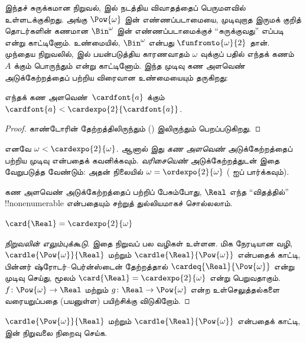 \documentclass[../../../include/open-logic-section]{subfiles}
\begin{document}
இந்தச் சுருக்கமான நிறுவல்,  இல்
நடத்திய விவாதத்தைப் பெருமளவில் உள்ளடக்குகிறது. அங்கு
$\Pow{\omega}$ இன் எண்ணப்படாமையை, முடிவுறாத இருமக் குறித்
தொடர்களின் கணமான $\Bin^\omega$ இன் எண்ணப்படாமைக்குச்
``சுருக்குவது'' எப்படி என்று காட்டினோம். உண்மையில்,
$\Bin^{\omega}$ என்பது $\funfromto{\omega}{2}$ தான்.
முந்தைய நிறுவலில்,  இல்
பயன்படுத்திய காரணவாதம் $\omega$ வுக்குப் பதில் எந்தக் கணம்~$A$
க்கும் பொருந்தும் என்று காட்டினோம். இந்த முடிவு கண அளவெண்
அடுக்கேற்றத்தைப் பற்றிய விரைவான உண்மையையும் தருகிறது:

\begin{cor}
எந்தக் கண அளவெண்~$\cardfont{a}$ க்கும்
$\cardfont{a} < \cardexpo{2}{\cardfont{a}}$.
\end{cor}

\begin{proof}
காண்டோரின் தேற்றத்திலிருந்தும்
()
 இலிருந்தும் பெறப்படுகிறது.
\end{proof}
\noindent
எனவே $\omega < \cardexpo{2}{\omega}$. ஆனால் இது
\emph{கண அளவெண்} அடுக்கேற்றத்தைப் பற்றிய முடிவு என்பதைக்
கவனிக்கவும். \emph{வரிசையெண்} அடுக்கேற்றத்துடன் இதை
வேறுபடுத்த வேண்டும்: அதன் நிலையில் $\omega =
\ordexpo{2}{\omega}$ (
ஐப் பார்க்கவும்).

கண அளவெண் அடுக்கேற்றத்தைப் பற்றிப் பேசும்போது, $\Real$
எந்த ``விதத்தில்'' !!{nonenumerable} என்பதையும் சற்றுத்
துல்லியமாகச் சொல்லலாம்.

\begin{thm}
$\card{\Real} = \cardexpo{2}{\omega}$
\end{thm}

\begin{proof}[நிறுவலின் எலும்புக்கூடு]
இதை நிறுவப் பல வழிகள் உள்ளன. மிக நேரடியான வழி,
$\cardle{\Pow{\omega}}{\Real}$ மற்றும்
$\cardle{\Real}{\Pow{\omega}}$ என்பதைக் காட்டி,
பின்னர் ஷ்ரோடர்--பெர்ன்ஸ்டைன் தேற்றத்தால்
$\cardeq{\Real}{\Pow{\omega}}$ என்று முடிவு செய்து,
 மூலம்
$\card{\Real} = \cardexpo{2}{\omega}$ என்று பெறுவதாகும்.
$f \colon \Pow{\omega} \to \Real$ மற்றும்
$g \colon \Real \to \Pow{\omega}$ என்ற உள்செலுத்தல்களை
வரையறுப்பதை (பயனுள்ள) பயிற்சிக்கு விடுகிறோம்.
\end{proof}

\begin{prob}
$\cardle{\Pow{\omega}}{\Real}$ மற்றும்
$\cardle{\Real}{\Pow{\omega}}$ என்பதைக் காட்டி,
 இன்
நிறுவலை நிறைவு செய்க.
\end{prob}
\end{document}
